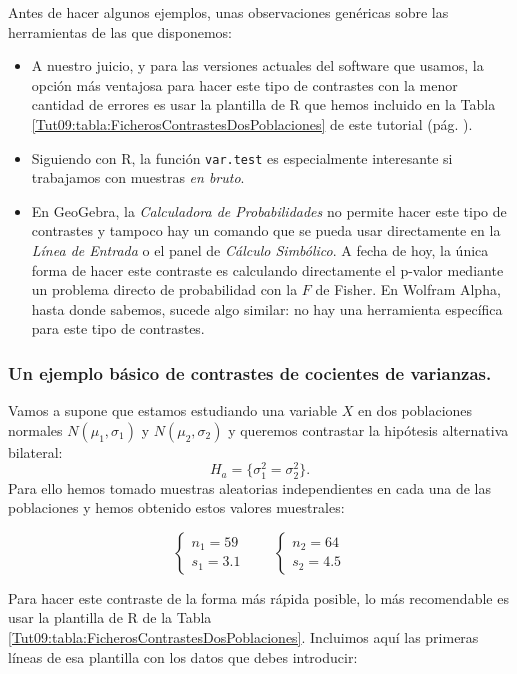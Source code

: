 \documentclass[10pt,a4paper]{article}\usepackage[]{graphicx}\usepackage[]{color}
\newcounter {cont01}
\begin{document}
Antes de hacer algunos ejemplos, unas observaciones genéricas sobre las herramientas de las que disponemos:

\begin{itemize}
  \item A nuestro juicio, y para las versiones actuales del software que usamos, la opción más ventajosa para hacer este tipo de contrastes con la menor cantidad de errores es usar la plantilla de R que hemos incluido en la Tabla \ref{Tut09:tabla:FicherosContrastesDosPoblaciones} de este tutorial (pág. \pageref{Tut09:tabla:FicherosContrastesDosPoblaciones}).
  \item Siguiendo con R, la función {\tt var.test} es especialmente interesante si trabajamos con muestras {\em en bruto}.
  \item En GeoGebra, la {\em Calculadora de Probabilidades} no permite hacer este tipo de contrastes y tampoco hay un comando que se pueda usar directamente en la {\em Línea de Entrada} o el panel de {\em Cálculo Simbólico}. A fecha de hoy, la única forma de hacer este contraste es calculando directamente el p-valor mediante un problema directo de probabilidad con la $F$ de Fisher. En Wolfram Alpha, hasta donde sabemos, sucede algo similar: no hay una herramienta específica para este tipo de contrastes.
\end{itemize}

\subsubsection*{Un ejemplo básico de contrastes de cocientes de varianzas.}

Vamos a supone que estamos estudiando una variable $X$ en dos poblaciones normales $N(\mu_1, \sigma_1)$ y $N(\mu_2, \sigma_2)$ y queremos contrastar la hipótesis alternativa bilateral:
\[H_a = \{\sigma_1 ^2 = \sigma_2^2\}.\]
Para ello hemos tomado muestras aleatorias independientes en cada una de las poblaciones y hemos obtenido estos valores muestrales:



\[
\begin{cases}
n_1 = 59\\[3mm]
s_1 = 3.1
\end{cases}
\qquad
\begin{cases}
n_2 = 64\\[3mm]
s_2 = 4.5
\end{cases}
\]


Para hacer este contraste de la forma más rápida posible, lo más recomendable es usar la plantilla de R de la Tabla \ref{Tut09:tabla:FicherosContrastesDosPoblaciones}. Incluimos aquí las primeras líneas de esa plantilla con los datos que debes introducir:
\end{document}
